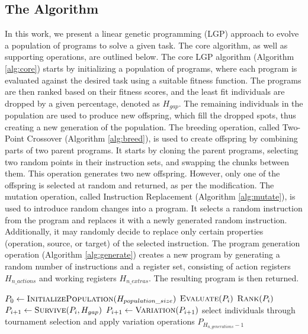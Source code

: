 \documentclass[12pt]{report}
\begin{document}
\subsection{The Algorithm}
In this work, we present a linear genetic programming (LGP) approach to evolve a population of programs to solve a given task. The core algorithm, as well as supporting operations, are outlined below.
The core LGP algorithm (Algorithm \ref{alg:core}) starts by initializing a population of programs, where each program is evaluated against the desired task using a suitable fitness function. The programs are then ranked based on their fitness scores, and the least fit individuals are dropped by a given percentage, denoted as $H_{gap}$. The remaining individuals in the population are used to produce new offspring, which fill the dropped spots, thus creating a new generation of the population.
The breeding operation, called Two-Point Crossover (Algorithm \ref{alg:breed}), is used to create offspring by combining parts of two parent programs. It starts by cloning the parent programs, selecting two random points in their instruction sets, and swapping the chunks between them. This operation generates two new offspring. However, only one of the offspring is selected at random and returned, as per the modification.
The mutation operation, called Instruction Replacement (Algorithm \ref{alg:mutate}), is used to introduce random changes into a program. It selects a random instruction from the program and replaces it with a newly generated random instruction. Additionally, it may randomly decide to replace only certain properties (operation, source, or target) of the selected instruction.
The program generation operation (Algorithm \ref{alg:generate}) creates a new program by generating a random number of instructions and a register set, consisting of action registers $H_{n\_actions}$ and working registers $H_{n\_extras}$. The resulting program is then returned.
\begin{algorithm}[!htb]
	\caption{Core: Linear Genetic Programming}
	\label{alg:core}
	\begin{algorithmic}[1]
		\State $P_{0} \gets \Call{InitializePopulation}{H_{population\_size}}$
		\State $\Call{Evaluate}{P_{i}}$
		\State $\Call{Rank}{P_{i}}$
		\State $P_{i+1} \gets \Call{Survive}{P_{i}, H_{gap}}$
		\State $P_{i+1} \gets \Call{Variation}{P_{i+1}}$
		\Comment select individuals through tournament selection and apply variation operations
		\EndFor
		\State \Return $P_{H_{n\_generations} - 1}$
	\end{algorithmic}
\end{algorithm}
\end{document}
